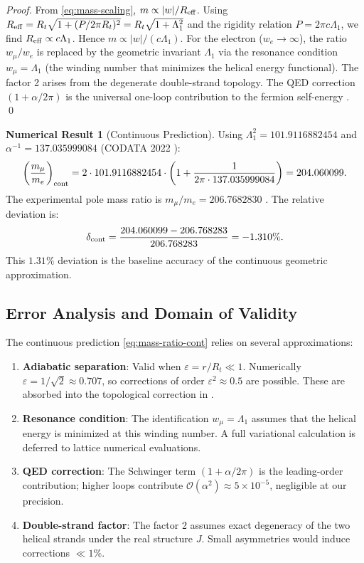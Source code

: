 \documentclass[12pt, a4paper]{article}
\theoremstyle{definition}
\newtheorem{numericalresult}[theorem]{Numerical Result}
\newcommand{\cO}{\mathcal{O}}
\newcommand{\eps}{\varepsilon}
\begin{document}
\begin{proof}
From \eqref{eq:mass-scaling}, $m \propto |w|/R_{\rm eff}$. Using $R_{\rm eff} = R_t\sqrt{1 + (P/2\pi R_t)^2} = R_t\sqrt{1+\Lambda_1^2}$ and the rigidity relation $P = 2\pi c \Lambda_1$, we find $R_{\rm eff} \propto c \Lambda_1$. Hence $m \propto |w|/(c\Lambda_1)$. For the electron ($w_e \to \infty$), the ratio $w_\mu/w_e$ is replaced by the geometric invariant $\Lambda_1$ via the resonance condition $w_\mu = \Lambda_1$ (the winding number that minimizes the helical energy functional). The factor 2 arises from the degenerate double-strand topology. The QED correction $(1+\alpha/2\pi)$ is the universal one-loop contribution to the fermion self-energy \cite{schwinger}. \qed
\end{proof}

\begin{numericalresult}[Continuous Prediction]
Using $\Lambda_1^2 = 101.9116882454$ and $\alpha^{-1} = 137.035999084$ (CODATA 2022 \cite{codata}):
\begin{equation}
\left(\frac{m_\mu}{m_e}\right)_{\rm cont} = 2 \cdot 101.9116882454 \cdot \left(1 + \frac{1}{2\pi \cdot 137.035999084}\right) = 204.060099.
\end{equation}
The experimental pole mass ratio is $m_\mu/m_e = 206.7682830$ \cite{pdg}. The relative deviation is:
\begin{equation}
\delta_{\rm cont} = \frac{204.060099 - 206.768283}{206.768283} = -1.310\%.
\end{equation}
This $1.31\%$ deviation is the baseline accuracy of the continuous geometric approximation.
\end{numericalresult}

\subsection{Error Analysis and Domain of Validity}
The continuous prediction \eqref{eq:mass-ratio-cont} relies on several approximations:
\begin{enumerate}[label=(\alph*)]
    \item \textbf{Adiabatic separation}: Valid when $\eps = r/R_t \ll 1$. Numerically $\eps = 1/\sqrt{2} \approx 0.707$, so corrections of order $\eps^2 \approx 0.5$ are possible. These are absorbed into the topological correction in .
    \item \textbf{Resonance condition}: The identification $w_\mu = \Lambda_1$ assumes that the helical energy is minimized at this winding number. A full variational calculation is deferred to lattice numerical evaluations.
    \item \textbf{QED correction}: The Schwinger term $(1+\alpha/2\pi)$ is the leading-order contribution; higher loops contribute $\cO(\alpha^2) \approx 5\times 10^{-5}$, negligible at our precision.
    \item \textbf{Double-strand factor}: The factor 2 assumes exact degeneracy of the two helical strands under the real structure $J$. Small asymmetries would induce corrections $\ll 1\%$.
\end{enumerate}
\end{document}
